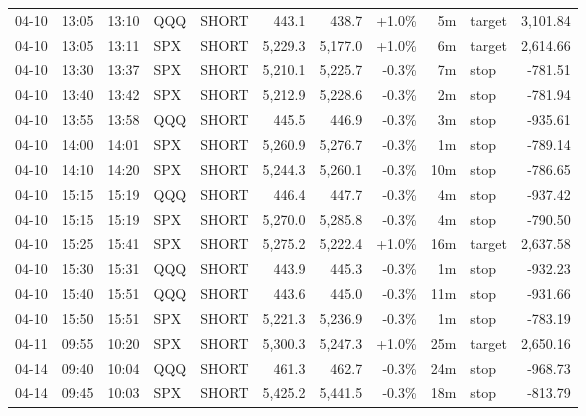 \documentclass[11pt,a4paper,twoside]{article}
\begin{document}
\begin{center}
\begin{longtable}{>{\color{txtmain}}l l l l l r r r r >{\color{txtmain}}l r}
04-10 & 13:05 & 13:10 & QQQ & SHORT & 443.1 & 438.7 & \textcolor{wingreen}{+1.0\%} & 5m & target & \textcolor{wingreen}{3,101.84} \\
04-10 & 13:05 & 13:11 & SPX & SHORT & 5,229.3 & 5,177.0 & \textcolor{wingreen}{+1.0\%} & 6m & target & \textcolor{wingreen}{2,614.66} \\
04-10 & 13:30 & 13:37 & SPX & SHORT & 5,210.1 & 5,225.7 & \textcolor{lossred}{-0.3\%} & 7m & stop & \textcolor{lossred}{-781.51} \\
04-10 & 13:40 & 13:42 & SPX & SHORT & 5,212.9 & 5,228.6 & \textcolor{lossred}{-0.3\%} & 2m & stop & \textcolor{lossred}{-781.94} \\
04-10 & 13:55 & 13:58 & QQQ & SHORT & 445.5 & 446.9 & \textcolor{lossred}{-0.3\%} & 3m & stop & \textcolor{lossred}{-935.61} \\
04-10 & 14:00 & 14:01 & SPX & SHORT & 5,260.9 & 5,276.7 & \textcolor{lossred}{-0.3\%} & 1m & stop & \textcolor{lossred}{-789.14} \\
04-10 & 14:10 & 14:20 & SPX & SHORT & 5,244.3 & 5,260.1 & \textcolor{lossred}{-0.3\%} & 10m & stop & \textcolor{lossred}{-786.65} \\
04-10 & 15:15 & 15:19 & QQQ & SHORT & 446.4 & 447.7 & \textcolor{lossred}{-0.3\%} & 4m & stop & \textcolor{lossred}{-937.42} \\
04-10 & 15:15 & 15:19 & SPX & SHORT & 5,270.0 & 5,285.8 & \textcolor{lossred}{-0.3\%} & 4m & stop & \textcolor{lossred}{-790.50} \\
04-10 & 15:25 & 15:41 & SPX & SHORT & 5,275.2 & 5,222.4 & \textcolor{wingreen}{+1.0\%} & 16m & target & \textcolor{wingreen}{2,637.58} \\
04-10 & 15:30 & 15:31 & QQQ & SHORT & 443.9 & 445.3 & \textcolor{lossred}{-0.3\%} & 1m & stop & \textcolor{lossred}{-932.23} \\
04-10 & 15:40 & 15:51 & QQQ & SHORT & 443.6 & 445.0 & \textcolor{lossred}{-0.3\%} & 11m & stop & \textcolor{lossred}{-931.66} \\
04-10 & 15:50 & 15:51 & SPX & SHORT & 5,221.3 & 5,236.9 & \textcolor{lossred}{-0.3\%} & 1m & stop & \textcolor{lossred}{-783.19} \\
04-11 & 09:55 & 10:20 & SPX & SHORT & 5,300.3 & 5,247.3 & \textcolor{wingreen}{+1.0\%} & 25m & target & \textcolor{wingreen}{2,650.16} \\
04-14 & 09:40 & 10:04 & QQQ & SHORT & 461.3 & 462.7 & \textcolor{lossred}{-0.3\%} & 24m & stop & \textcolor{lossred}{-968.73} \\
04-14 & 09:45 & 10:03 & SPX & SHORT & 5,425.2 & 5,441.5 & \textcolor{lossred}{-0.3\%} & 18m & stop & \textcolor{lossred}{-813.79} \\

\end{longtable}
\end{center}
\end{document}
